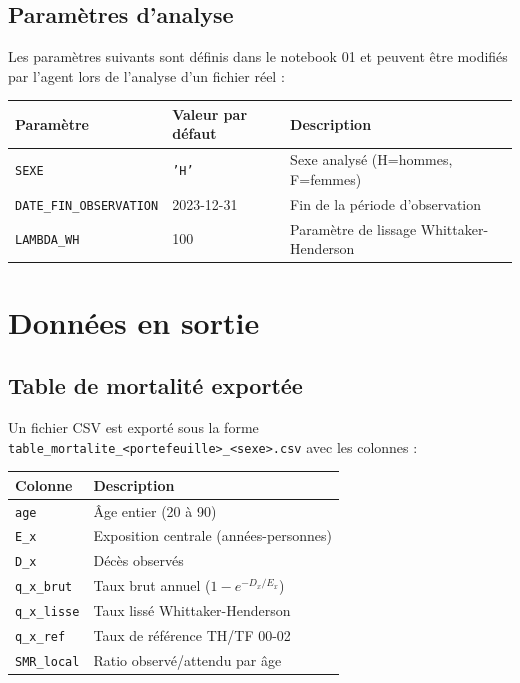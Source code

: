 \documentclass[11pt,a4paper]{article}
\begin{document}
\subsection{Paramètres d'analyse}
Les paramètres suivants sont définis dans le notebook 01 et peuvent être modifiés
par l'agent lors de l'analyse d'un fichier réel :

\begin{center}
\begin{tabular}{lll}
\toprule
\textbf{Paramètre} & \textbf{Valeur par défaut} & \textbf{Description} \\
\midrule
\texttt{SEXE} & \texttt{'H'} & Sexe analysé (H=hommes, F=femmes) \\
\texttt{DATE\_FIN\_OBSERVATION} & 2023-12-31 & Fin de la période d'observation \\
\texttt{LAMBDA\_WH} & 100 & Paramètre de lissage Whittaker-Henderson \\
\bottomrule
\end{tabular}
\end{center}

\section{Données en sortie}

\subsection{Table de mortalité exportée}
Un fichier CSV est exporté sous la forme \texttt{table\_mortalite\_<portefeuille>\_<sexe>.csv}
avec les colonnes :

\begin{center}
\begin{tabular}{ll}
\toprule
\textbf{Colonne} & \textbf{Description} \\
\midrule
\texttt{age} & Âge entier (20 à 90) \\
\texttt{E\_x} & Exposition centrale (années-personnes) \\
\texttt{D\_x} & Décès observés \\
\texttt{q\_x\_brut} & Taux brut annuel ($1-e^{-D_x/E_x}$) \\
\texttt{q\_x\_lisse} & Taux lissé Whittaker-Henderson \\
\texttt{q\_x\_ref} & Taux de référence TH/TF 00-02 \\
\texttt{SMR\_local} & Ratio observé/attendu par âge \\
\bottomrule
\end{tabular}
\end{center}
\end{document}
